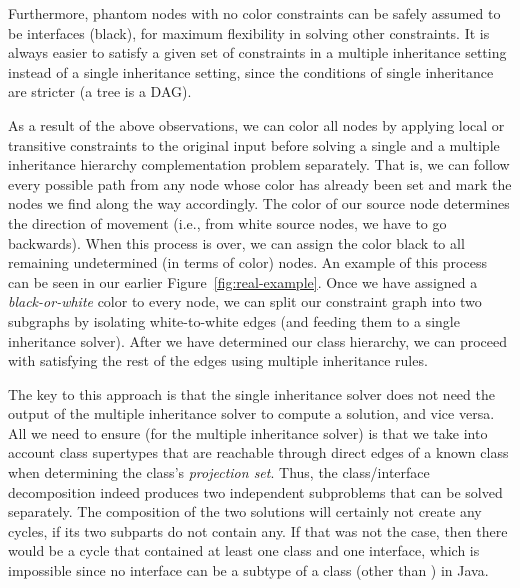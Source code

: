 Furthermore, phantom nodes with no color constraints can be safely
assumed to be interfaces (black), for maximum flexibility in solving
other constraints. It is always easier to satisfy a given set
of constraints in a multiple inheritance setting instead of a single
inheritance setting, since the conditions of single inheritance are
stricter (a tree is a DAG).

As a result of the above observations, we can color all nodes by
applying local or transitive constraints to the original input before
solving a single and a multiple inheritance hierarchy complementation
problem separately.  That is, we can follow every possible path from
any node whose color has already been set and mark the nodes we find
along the way accordingly. The color of our source node determines the
direction of movement (i.e., from white source nodes, we have to go
backwards). When this process is over, we can assign the color black
to all remaining undetermined (in terms of color) nodes.  An example
of this process can be seen in our earlier
Figure~\ref{fig:real-example}. Once we have assigned a
\emph{black-or-white} color to every node, we can split our constraint
graph into two subgraphs by isolating white-to-white edges (and
feeding them to a single inheritance solver). After we have determined
our class hierarchy, we can proceed with satisfying the rest of the
edges using multiple inheritance rules.

The key to this approach is that the single inheritance solver does
not need the output of the multiple inheritance solver to compute a
solution, and vice versa. All we need to ensure (for the multiple
inheritance solver) is that we take into account class supertypes that
are reachable through direct edges of a known class when determining
the class's \emph{projection set}. Thus, the class/interface
decomposition indeed produces two independent subproblems that can be
solved separately. The composition of the two solutions will certainly
not create any cycles, if its two subparts do not contain any. If that
was not the case, then there would be a cycle that contained at least
one class and one interface, which is impossible since no interface
can be a subtype of a class (other than ) in Java.

